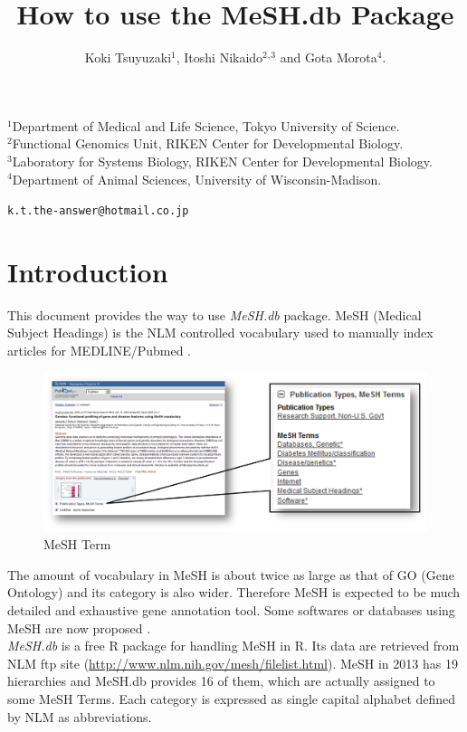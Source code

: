 \documentclass[11pt]{article}
\newcommand{\Rpackage}[1]{{\textit{#1}}}
\begin{document}
\title{\bf How to use the MeSH.db Package}
\author{Koki Tsuyuzaki$^1$, Itoshi Nikaido$^2$$^,$$^3$ and Gota Morota$^4$.}
\maketitle
\begin{center}
\noindent
$^1$Department of Medical and Life Science, Tokyo University of Science.\\
\noindent
$^2$Functional Genomics Unit, RIKEN Center for Developmental Biology.\\
\noindent
$^3$Laboratory for Systems Biology, RIKEN Center for Developmental Biology.\\
\noindent
$^4$Department of Animal Sciences, University of Wisconsin-Madison.\\
\end{center}

\begin{center}
{\tt k.t.the-answer@hotmail.co.jp}
\end{center}
\tableofcontents

\newpage
\section{Introduction}
This document provides the way to use \Rpackage{MeSH.db} package. MeSH (Medical Subject Headings) is the NLM controlled vocabulary used to manually index articles for MEDLINE/Pubmed \cite{Nelson2004}. 

\begin{figure}[ht]
\centering
\includegraphics[width=\linewidth]{fig1.png}
\caption{MeSH Term}
\label{fig1}
\end{figure}

The amount of vocabulary in MeSH is about twice as large as that of GO (Gene Ontology)\cite{Ashburner2000} and its category is also wider. Therefore MeSH is expected to be much detailed and exhaustive gene annotation tool. Some softwares or databases using MeSH are now proposed \cite{Nakazato2007,Nakazato2009,Saurin2010,Sartor2012}.\\
\Rpackage{MeSH.db} is a free R package for handling MeSH in R. Its data are retrieved from NLM ftp site (\url{http://www.nlm.nih.gov/mesh/filelist.html}). MeSH in 2013 has 19 hierarchies and MeSH.db provides 16 of them, which are actually assigned to some MeSH Terms. Each category is expressed as single capital alphabet defined by NLM as abbreviations.
\end{document}
